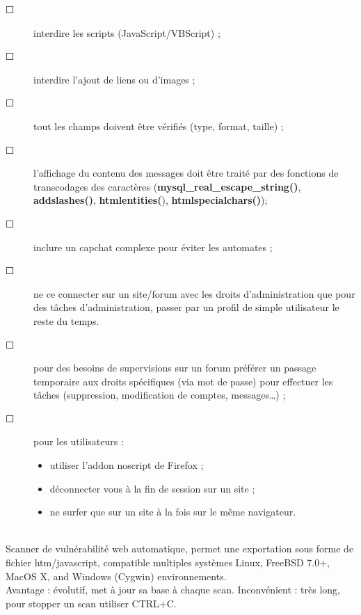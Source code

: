 \documentclass[a4paper,11pt]{article}				    %
\begin{document}
{\begin{description}
   \item[$\Square$] interdire les scripts (JavaScript/VBScript) ;
   \item[$\Square$] interdire l'ajout de liens ou d'images ;
   \item[$\Square$] tout les champs doivent \^etre v\'erifi\'es (type, format, taille) ;
   \item[$\Square$] l'affichage du contenu des messages doit \^etre trait\'e par des fonctions de transcodages des caract\`eres (\textbf{mysql\_real\_escape\_string()}, \textbf{addslashes()}, \textbf{htmlentities(}), \textbf{htmlspecialchars()});

   \item[$\Square$] inclure un capchat complexe pour \'eviter les automates ;
   \item[$\Square$] ne ce connecter sur un site/forum avec les droits d'administration que pour des t\^aches d'administration, 
passer par un profil de simple utilisateur le reste du temps.
   \item[$\Square$] pour des besoins de supervisions sur un forum pr\'ef\'erer un passage temporaire aux droits sp\'ecifiques (via mot de passe) pour effectuer les t\^aches (suppression, modification de comptes, messages\dots{}) ;
   \item[$\Square$] pour les utilisateurs : 
		\begin{itemize}
			\item utiliser l'addon noscript de Firefox ;
			\item d\'econnecter vous \`a la fin de session sur un site ;
			\item ne surfer que sur un site \`a la fois sur le m\^eme navigateur.
		\end{itemize}
\end{description}
}
{
\\Scanner de vuln\'erabilit\'e web automatique, permet une exportation sous forme de fichier htm/javascript, compatible multiples syst\`emes
Linux, FreeBSD 7.0+, MacOS X, and Windows (Cygwin) environnements.\\
Avantage : \'evolutif, met \`a jour sa base \`a chaque scan.
Inconv\'enient : tr\`es long, pour stopper un scan utiliser CTRL+C.
}
\end{document}
